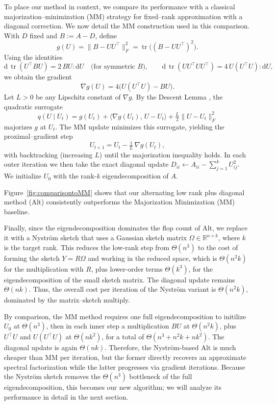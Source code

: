 \documentclass[final,hidelinks,onefignum,onetabnum]{siamart250211}
\providecommand{\1}{\mathbf{1}}
\theoremstyle{plain}
\begin{document}
To place our method in context, we compare its performance with a classical
majorization--minimization (MM) strategy for fixed--rank approximation with a diagonal
correction.  We now detail the MM construction used in this comparison.  With $D$ fixed and
$B:=A-D$, define
\[
g(U)=\|B-UU^\top\|_F^2=\operatorname{tr}\!\big((B-UU^\top)^2\big).
\]
Using the identities
\[
\mathrm{d}\,\operatorname{tr}(U^\top B U)=2\,B U:\mathrm{d}U
\quad\text{(for symmetric $B$)}, 
\qquad
\mathrm{d}\,\operatorname{tr}(UU^\top UU^\top)=4\,U(U^\top U):\mathrm{d}U,
\]
we obtain the gradient
\[
\nabla g(U)=4\big(U(U^\top U)-BU\big).
\]
Let $L>0$ be any Lipschitz constant of $\nabla g$.  By the Descent Lemma
\cite{sun2016majorization}, the quadratic surrogate
\[
q(U\mid U_t)
=
g(U_t)
+\langle\nabla g(U_t),\,U-U_t\rangle
+\tfrac{L}{2}\|U-U_t\|_F^2
\]
majorizes $g$ at $U_t$.  The MM update minimizes this surrogate, yielding the
proximal--gradient step
\[
U_{t+1}=U_t-\tfrac{1}{L}\,\nabla g(U_t),
\]
with backtracking (increasing $L$) until the majorization inequality holds.
In each outer iteration we then take the exact diagonal update
$ D_{ii}\gets A_{ii}-\sum_{j=1}^k U_{ij}^2.$
We initialize $U_0$ with the rank-$k$ eigendecomposition of $A$.




Figure~\ref{fig:comparisontoMM} shows that our alternating low rank plus diagonal method (Alt)
consistently outperforms the Majorization Minimization (MM) baseline.


Finally, since the eigendecomposition dominates the flop count of Alt, we replace it with a Nyström sketch \cite{tropp2017fixed} that uses a Gaussian sketch matrix $\Omega \in \mathbb{R}^{n\times k}$, where $k$ is the target rank. This reduces the low-rank step from $\Theta(n^3)$ to the cost of forming the sketch $Y = R\Omega$ and working in the reduced space, which is $\Theta(n^2k)$ for the multiplication with $R$, plus lower-order terms $\Theta(k^3)$, for the eigendecomposition of the small sketch matrix. The diagonal update remains $\Theta(nk)$. Thus, the overall cost per iteration of the Nyström variant is $\Theta(n^2k)$, dominated by the matrix–sketch multiply.

By comparison, the MM method requires one full eigendecomposition to initilize $U_0$ at $\Theta(n^3)$, then in each inner step a multiplication $BU$ at $\Theta(n^2k)$, plus $U^\top U$ and $U(U^\top U)$ at $\Theta(nk^2)$, for a total of $\Theta(n^3 + n^2k + nk^2)$. The diagonal update is again $\Theta(nk)$. Therefore, the Nyström-based Alt is much cheaper than MM per iteration, but the former directly recovers an approximate spectral factorization while the latter progresses via gradient iterations. Because the Nyström sketch removes the $\Theta(n^3)$ bottleneck of the full eigendecomposition, this becomes our new algorithm; we will analyze its performance in detail in the next section.
\end{document}
